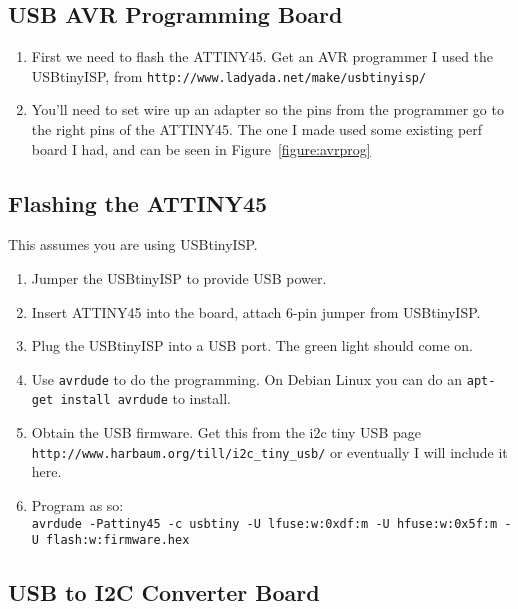 \documentclass[11pt]{article}
\begin{document}
\subsection{USB AVR Programming Board}

\begin{figure*}[tbp]
\begin{center}
\caption{Setup for flashing ATTINY45 with USB-tiny-ISP}
\label{figure:avrprog}
\end{center}
\end{figure*}

\begin{enumerate}
\item First we need to flash the ATTINY45.  Get an AVR programmer
I used the USBtinyISP, from {\tt http://www.ladyada.net/make/usbtinyisp/}
\item You'll need to set wire up an adapter so the pins from the 
programmer go to the right pins of the ATTINY45.  The one I made used
some existing perf board I had, and can be seen in Figure~\ref{figure:avrprog}
\end{enumerate}

\pagebreak

\subsection{Flashing the ATTINY45}

This assumes you are using USBtinyISP.
\begin{enumerate}
\item Jumper the USBtinyISP to provide USB power.
\item Insert ATTINY45 into the board, attach 6-pin jumper
      from USBtinyISP.
\item Plug the USBtinyISP into a USB port.  The green light
      should come on.
\item Use {\tt avrdude} to do the programming.  On Debian Linux
      you can do an {\tt apt-get install avrdude} to install.
\item Obtain the USB firmware.  Get this from the 
      i2c tiny USB page
      {\tt http://www.harbaum.org/till/i2c\_tiny\_usb/} or eventually
      I will include it here.
\item Program as so:\\
      {\tt avrdude -Pattiny45 -c usbtiny -U lfuse:w:0xdf:m 
       -U hfuse:w:0x5f:m -U flash:w:firmware.hex}
\end{enumerate}


\begin{figure*}[tbp]
\begin{center}
\caption{Layout of USB to i2c board.}
\label{figure:usbi2c}
\end{center}
\end{figure*}

\subsection{USB to I2C Converter Board}
\end{document}
